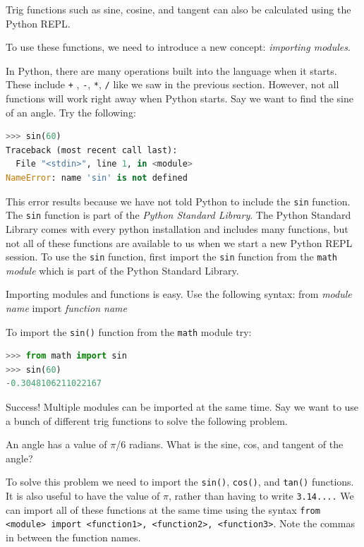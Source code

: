 \documentclass{book}
\begin{document}
    
        Trig functions such as sine, cosine, and tangent can also be calculated
using the Python REPL.

To use these functions, we need to introduce a new concept:
\emph{importing modules}.

In Python, there are many operations built into the language when it
starts. These include \lstinline!+! , \lstinline!-!, \lstinline!*!,
\lstinline!/! like we saw in the previous section. However, not all
functions will work right away when Python starts. Say we want to find
the sine of an angle. Try the following:

\begin{lstlisting}[language=Python]
>>> sin(60)
Traceback (most recent call last):
  File "<stdin>", line 1, in <module>
NameError: name 'sin' is not defined
\end{lstlisting}

This error results because we have not told Python to include the
\lstinline!sin! function. The \lstinline!sin! function is part of the
\emph{Python Standard Library}. The Python Standard Library comes with
every python installation and includes many functions, but not all of
these functions are available to us when we start a new Python REPL
session. To use the \lstinline!sin! function, first import the
\lstinline!sin! function from the \lstinline!math! \emph{module} which
is part of the Python Standard Library.

Importing modules and functions is easy. Use the following syntax: from
\emph{module name} import \emph{function name}

To import the \lstinline!sin()! function from the \lstinline!math!
module try:

\begin{lstlisting}[language=Python]
>>> from math import sin
>>> sin(60)
-0.3048106211022167
\end{lstlisting}

Success! Multiple modules can be imported at the same time. Say we want
to use a bunch of different trig functions to solve the following
problem.

An angle has a value of \(\pi\)/6 radians. What is the sine, cos, and
tangent of the angle?

To solve this problem we need to import the \lstinline!sin()!,
\lstinline!cos()!, and \lstinline!tan()! functions. It is also useful to
have the value of \(\pi\), rather than having to write
\lstinline!3.14....! We can import all of these functions at the same
time using the syntax
\lstinline!from <module> import <function1>, <function2>, <function3>!.
Note the commas in between the function names.
\end{document}

